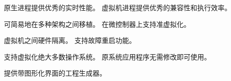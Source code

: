 \begin{description}[leftmargin=0pt,labelindent=0pt,style=nextline,itemsep=8pt]
    \item[\textsf{\color{rvmpurple}高性能实时响应}]
    原生进程提供优秀的实时性能。
    虚拟机进程提供优秀的兼容性和执行效率。

    \item[\textsf{\color{rvmpurple}全面的体系架构支持}]
    可简易地在多种架构之间移植。
    在微控制器上支持准虚拟化。

    \item[\textsf{\color{rvmpurple}高安全性}]
    虚拟机之间硬件隔离。
    支持故障重启功能。

    \item[\textsf{\color{rvmpurple}全面的生态环境}]
    支持虚拟化绝大多数操作系统。
    原系统应用程序无需修改即可使用。

    \item[\textsf{\color{rvmpurple}高易用性}]
    提供带图形化界面的工程生成器。
\end{description}

\newcommand{\RVMRevisionHistory}{%
\chapter*{版本历史}
\addcontentsline{toc}{chapter}{版本历史}
\markboth{版本历史}{}
\begin{table}[htbp]
    \centering
    \renewcommand{\arraystretch}{1.25}
    \small
    \begin{tabularx}{\textwidth}{@{}>{\sffamily\bfseries\color{rvmpurple}}m{1.8cm}
                                  >{\raggedright\arraybackslash}m{3.2cm}X@{}}
    \toprule
    版本 & 日期（年-月-日） & 说明 \\
    \midrule
    R1T1 & 2018-03-09 & 初始发布。 \\
    R2T1 & 2018-09-18 & 增加了移植说明。 \\
    R3T1 & 2025-03-20 & 发布 R3T1 技术参考手册。 \\
    \bottomrule
    \end{tabularx}
\end{table}
}
